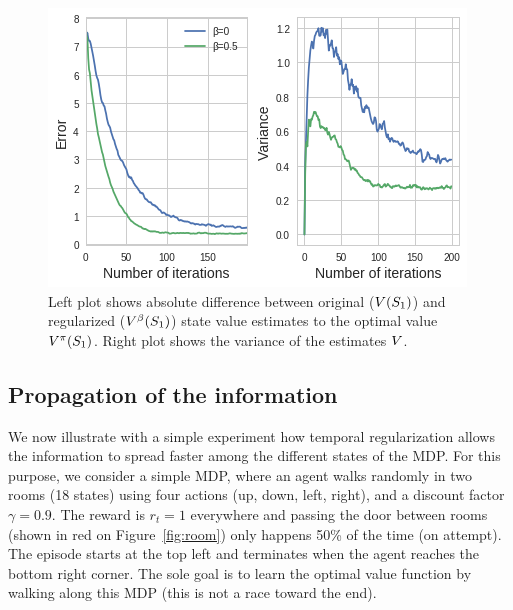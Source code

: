 \begin{figure}
	\centering

	\includegraphics[scale=0.7]{./fig/Exp_2_result.png}
\caption[Variance reduction]{Left plot shows absolute difference between original ($V (S_1)$) and regularized ($V^{\beta} (S_1)$) state value estimates to the optimal value $V^{\pi} (S_1)$. Right plot shows the variance of the estimates $V$.}
\label{fig:perf_MDP}
\end{figure}


\subsection{Propagation of the information}
We now illustrate with a simple experiment how temporal regularization allows the information to spread faster among the different states of the MDP. For this purpose, we consider a simple MDP, where an agent walks randomly in two rooms (18 states) using four actions (up, down, left, right), and a discount factor $\gamma=0.9$. The reward is $r_t=1$ everywhere and passing the door between rooms (shown in red on Figure~\ref{fig:room}) only happens 50\% of the time (on attempt). The episode starts at the top left and terminates when the agent reaches the bottom right corner. The sole goal is to learn the optimal value function by walking along this MDP (this is not a race toward the end).

